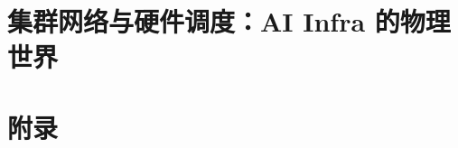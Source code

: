 \documentclass[UTF8,openany,zihao=-4]{ctexbook}
\begin{document}






\part{集群网络与硬件调度：AI Infra 的物理世界}






\appendix

\part{附录}






\backmatter



\end{document}

